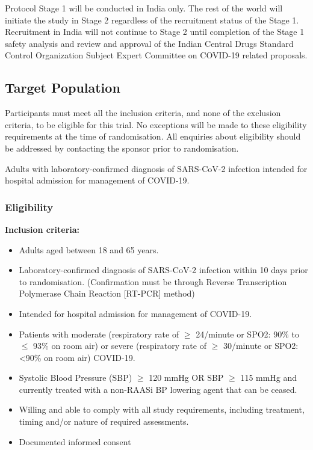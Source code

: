 \documentclass[11pt,parskip=half-]{scrartcl}
\begin{document}
Protocol Stage 1 will be conducted in India only. The rest of the world will initiate the study in Stage 2 regardless of the recruitment status of the Stage 1. Recruitment in India will not continue to Stage 2 until completion of the Stage 1 safety analysis and review and approval of the Indian Central Drugs Standard Control Organization Subject Expert Committee on COVID-19 related proposals.


\subsection{Target Population}
Participants must meet all the inclusion criteria, and none of the exclusion criteria, to be eligible for this trial. No exceptions will be made to these eligibility requirements at the time of randomisation. All enquiries about eligibility should be addressed by contacting the sponsor prior to randomisation.

Adults with laboratory-confirmed diagnosis of SARS-CoV-2 infection intended for hospital admission for management of COVID-19.

\subsubsection{Eligibility}
\textbf{Inclusion criteria:}
\begin{itemize}
    \item Adults aged between 18 and 65 years.
    \item Laboratory-confirmed diagnosis of SARS-CoV-2 infection within 10 days prior to randomisation. (Confirmation must be through Reverse Transcription Polymerase Chain Reaction [RT-PCR] method)
    \item Intended for hospital admission for management of COVID-19.
    \item  Patients with moderate (respiratory rate of $\geq$ 24/minute or SPO2: 90\% to $\leq$ 93\% on room air) or severe (respiratory rate of $\geq$ 30/minute or SPO2: <90\% on room air) COVID-19.
    \item  Systolic Blood Pressure (SBP) $\geq$ 120 mmHg OR SBP $\geq$ 115 mmHg and currently treated with a non-RAASi BP lowering agent that can be ceased.
    \item Willing and able to comply with all study requirements, including treatment, timing and/or nature of required assessments.
    \item Documented informed consent
\end{itemize}
\end{document}

